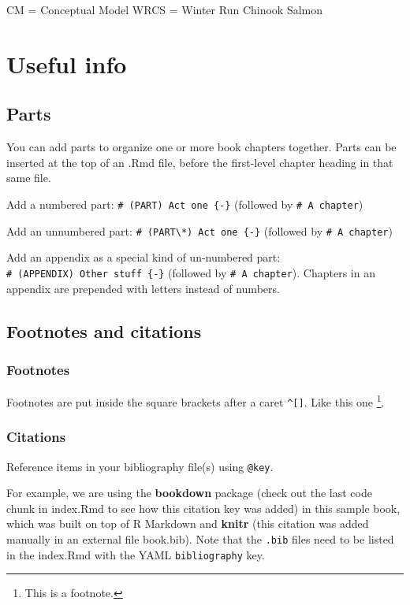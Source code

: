 \documentclass[
]{book}
\theoremstyle{definition}
\theoremstyle{definition}
\theoremstyle{definition}
\theoremstyle{definition}
\theoremstyle{remark}
\begin{document}
CM = Conceptual Model
WRCS = Winter Run Chinook Salmon

\hypertarget{useful-info}{%
\chapter{Useful info}\label{useful-info}}

\hypertarget{parts}{%
\section{Parts}\label{parts}}

You can add parts to organize one or more book chapters together. Parts can be inserted at the top of an .Rmd file, before the first-level chapter heading in that same file.

Add a numbered part: \texttt{\#\ (PART)\ Act\ one\ \{-\}} (followed by \texttt{\#\ A\ chapter})

Add an unnumbered part: \texttt{\#\ (PART\textbackslash{}*)\ Act\ one\ \{-\}} (followed by \texttt{\#\ A\ chapter})

Add an appendix as a special kind of un-numbered part: \texttt{\#\ (APPENDIX)\ Other\ stuff\ \{-\}} (followed by \texttt{\#\ A\ chapter}). Chapters in an appendix are prepended with letters instead of numbers.

\hypertarget{footnotes-and-citations}{%
\section{Footnotes and citations}\label{footnotes-and-citations}}

\hypertarget{footnotes}{%
\subsection{Footnotes}\label{footnotes}}

Footnotes are put inside the square brackets after a caret \texttt{\^{}{[}{]}}. Like this one \footnote{This is a footnote.}.

\hypertarget{citations}{%
\subsection{Citations}\label{citations}}

Reference items in your bibliography file(s) using \texttt{@key}.

For example, we are using the \textbf{bookdown} package \citep{R-bookdown} (check out the last code chunk in index.Rmd to see how this citation key was added) in this sample book, which was built on top of R Markdown and \textbf{knitr} \citep{xie2015} (this citation was added manually in an external file book.bib).
Note that the \texttt{.bib} files need to be listed in the index.Rmd with the YAML \texttt{bibliography} key.
\end{document}
